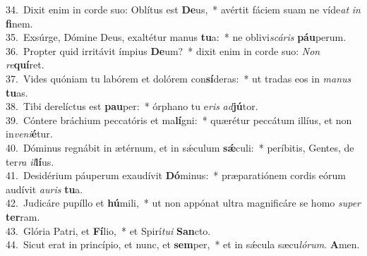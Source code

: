 {34.~}Dixit enim in corde suo: Oblítus est \textbf{De}us,~* avértit fáciem suam ne víde\textit{at} \textit{in} \textbf{fi}nem.\\
{35.~}Exsúrge, Dómine Deus, exaltétur manus \textbf{tu}a:~* ne oblivi\textit{scá}\textit{ris} \textbf{páu}perum.\\
{36.~}Propter quid irritávit ímpius \textbf{De}um?~* dixit enim in corde suo: \textit{Non} \textit{re}\textbf{quí}ret.\\
{37.~}Vides quóniam tu labórem et dolórem con\textbf{sí}deras:~* ut tradas eos in \textit{ma}\textit{nus} \textbf{tu}as.\\
{38.~}Tibi derelíctus est \textbf{pau}per:~* órphano tu e\textit{ris} \textit{ad}\textbf{jú}tor.\\
{39.~}Cóntere bráchium peccatóris et ma\textbf{lí}gni:~* quærétur peccátum illíus, et non in\textit{ve}\textit{ni}\textbf{é}tur.\\
{40.~}Dóminus regnábit in ætérnum, et in sǽculum \textbf{sǽ}culi:~* períbitis, Gentes, de ter\textit{ra} \textit{il}\textbf{lí}us.\\
{41.~}Desidérium páuperum exaudívit \textbf{Dó}minus:~* præparatiónem cordis eórum audívit \textit{au}\textit{ris} \textbf{tu}a.\\
{42.~}Judicáre pupíllo et \textbf{hú}mili,~* ut non appónat ultra magnificáre se homo \textit{su}\textit{per} \textbf{ter}ram.\\
{43.~}Glória Patri, et \textbf{Fí}lio,~* et Spirí\textit{tu}\textit{i} \textbf{San}cto.\\
{44.~}Sicut erat in princípio, et nunc, et \textbf{sem}per,~* et in sǽcula sæcu\textit{ló}\textit{rum}. \textbf{A}men.\\
